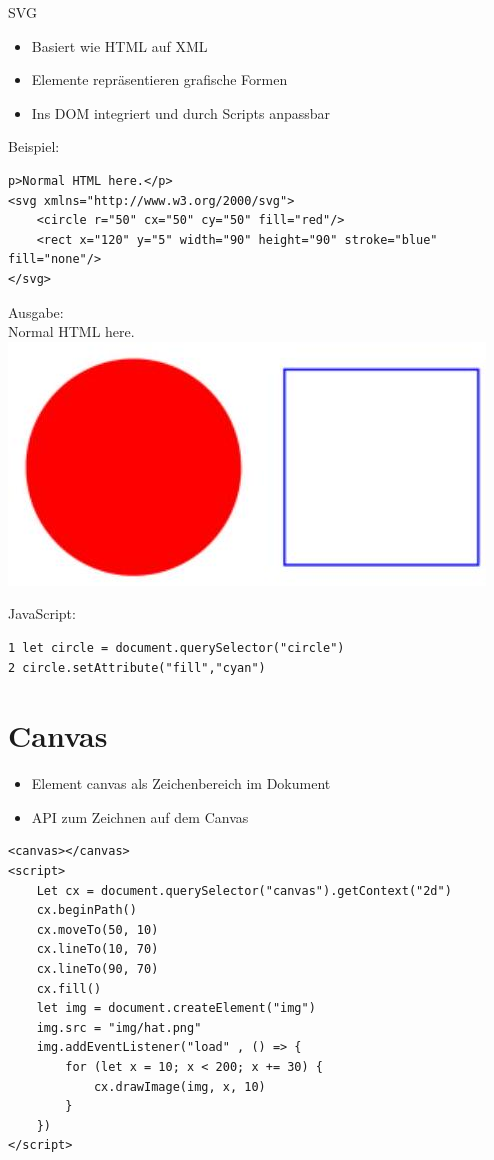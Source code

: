 \documentclass[10pt]{article}
\begin{document}
SVG

\begin{itemize}
  \item Basiert wie HTML auf XML
  \item Elemente repräsentieren grafische Formen
  \item Ins DOM integriert und durch Scripts anpassbar
\end{itemize}

Beispiel:

\begin{verbatim}
p>Normal HTML here.</p>
<svg xmlns="http://www.w3.org/2000/svg">
    <circle r="50" cx="50" cy="50" fill="red"/>
    <rect x="120" y="5" width="90" height="90" stroke="blue" fill="none"/>
</svg>
\end{verbatim}

Ausgabe:\\
Normal HTML here.\\
\includegraphics[width=\linewidth]{images/2024_12_29_858f09cde51177c71657g-27}

JavaScript:

\begin{verbatim}
1 let circle = document.querySelector("circle")
2 circle.setAttribute("fill","cyan")
\end{verbatim}

\section*{Canvas}
\begin{itemize}
  \item Element canvas als Zeichenbereich im Dokument
  \item API zum Zeichnen auf dem Canvas
\end{itemize}

\begin{verbatim}
<canvas></canvas>
<script>
    Let cx = document.querySelector("canvas").getContext("2d")
    cx.beginPath()
    cx.moveTo(50, 10)
    cx.lineTo(10, 70)
    cx.lineTo(90, 70)
    cx.fill()
    let img = document.createElement("img")
    img.src = "img/hat.png"
    img.addEventListener("load" , () => {
        for (let x = 10; x < 200; x += 30) {
            cx.drawImage(img, x, 10)
        }
    })
</script>
\end{verbatim}
\end{document}
